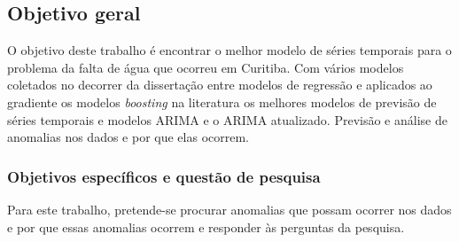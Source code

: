 \subsection{Objetivo geral} \label{subsec:objetivos}

 
O objetivo deste trabalho é encontrar o melhor modelo de séries temporais para o problema da falta de água que ocorreu em Curitiba. Com vários modelos coletados no decorrer da dissertação entre modelos de regressão e aplicados ao gradiente os modelos \textit{boosting} na literatura os melhores modelos de previsão de séries temporais e modelos ARIMA e o ARIMA atualizado. Previsão e análise de anomalias nos dados e por que elas ocorrem.
    
    
    \subsubsection{Objetivos espec\'ificos e quest\~ao de pesquisa} \label{subsubsec:obespec}
    
Para este trabalho, pretende-se procurar anomalias que possam ocorrer nos dados e por que essas anomalias ocorrem e responder às perguntas da pesquisa.

